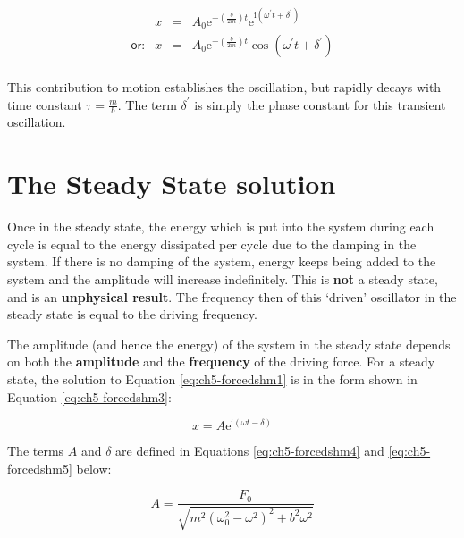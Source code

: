 \documentclass[
]{book}
\begin{document}
\begin{equation}
\begin{array}{lrcl}
 & x &=& A_0 \mathrm{e}^{- \left(\frac{b}{2m}\right)t} \mathrm{e}^{\mathrm{i} \left( \omega^\prime t + \delta^\prime \right)} \\
\textsf{or:} & x &=& A_0 \mathrm{e}^{- \left(\frac{b}{2m}\right)t} \cos \left( \omega^\prime t + \delta^\prime \right) \\
\end{array}
\label{eq:ch5-forcedshm2}
\end{equation}

This contribution to motion establishes the oscillation, but rapidly decays with time constant \(\tau = \frac{m}{b}\). The term \(\delta^\prime\) is simply the phase constant for this transient oscillation.

\hypertarget{sec:ch5-steadystatesolution}{%
\section{The Steady State solution}\label{sec:ch5-steadystatesolution}}

Once in the steady state, the energy which is put into the system during each cycle is equal to the energy dissipated per cycle due to the damping in the system. If there is no damping of the system, energy keeps being added to the system and the amplitude will increase indefinitely. This is \textbf{not} a steady state, and is an \textbf{unphysical result}. The frequency then of this `driven' oscillator in the steady state is equal to the driving frequency.

The amplitude (and hence the energy) of the system in the steady state depends on both the \textbf{amplitude} and the \textbf{frequency} of the driving force. For a steady state, the solution to Equation \eqref{eq:ch5-forcedshm1} is in the form shown in Equation \eqref{eq:ch5-forcedshm3}:

\begin{equation}
x = A \mathrm{e}^{\mathrm{i}\left(\omega t - \delta \right)}
\label{eq:ch5-forcedshm3}
\end{equation}

The terms \(A\) and \(\delta\) are defined in Equations \eqref{eq:ch5-forcedshm4} and \eqref{eq:ch5-forcedshm5} below:

\begin{equation}
A = \frac{F_0}{\sqrt{m^2 \left(\omega_0^2 - \omega^2 \right)^2 + b^2 \omega^2}}
\label{eq:ch5-forcedshm4}
\end{equation}
\end{document}
